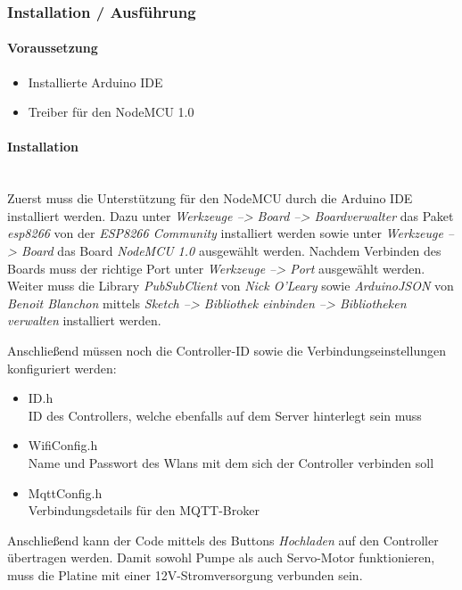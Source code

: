     \subsubsection{Installation / Ausführung}
    
    \paragraph*{Voraussetzung}
    \begin{itemize}
        \item Installierte Arduino IDE
        \item Treiber für den NodeMCU 1.0
    \end{itemize}

    \paragraph*{Installation}\mbox{}\\
    Zuerst muss die Unterstützung für den NodeMCU durch die Arduino IDE installiert werden. Dazu unter \textit{Werkzeuge --> Board --> Boardverwalter} das Paket \textit{esp8266} von der \textit{ESP8266 Community} installiert werden sowie unter \textit{Werkzeuge --> Board} das Board \textit{NodeMCU 1.0} ausgewählt werden. Nachdem Verbinden des Boards muss der richtige Port unter \textit{Werkzeuge --> Port} ausgewählt werden. Weiter muss die Library \textit{PubSubClient} von \textit{Nick O'Leary} sowie \textit{ArduinoJSON} von \textit{Benoit Blanchon} mittels \textit{Sketch --> Bibliothek einbinden --> Bibliotheken verwalten} installiert werden.
    
    Anschließend müssen noch die Controller-ID sowie die Verbindungseinstellungen konfiguriert werden:
    \begin{itemize}
        \item ID.h\\
        ID des Controllers, welche ebenfalls auf dem Server hinterlegt sein muss
        \item WifiConfig.h\\
        Name und Passwort des Wlans mit dem sich der Controller verbinden soll
        \item MqttConfig.h\\
        Verbindungsdetails für den MQTT-Broker
    \end{itemize}

    Anschließend kann der Code mittels des Buttons \textit{Hochladen} auf den Controller übertragen werden. Damit sowohl Pumpe als auch Servo-Motor funktionieren, muss die Platine mit einer 12V-Stromversorgung verbunden sein.
    
     
    